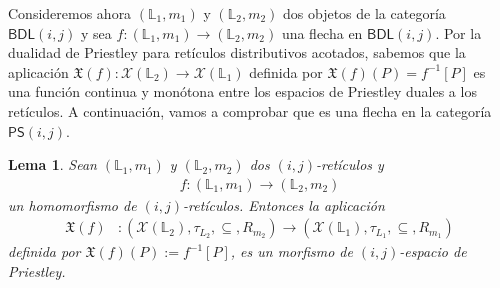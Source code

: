 \documentclass[12pt]{book}
\newtheorem{lemma}[theorem]{Lema}
\newcommand{\BDL}{\mathsf{BDL}}
\newcommand{\PS}{\mathsf{PS}}
\begin{document}
Consideremos ahora $(\mathbb{L}_1, m_1)$ y $(\mathbb{L}_2, m_2)$ dos objetos de la categoría $\BDL(i,j)$ y sea 
$f: (\mathbb{L}_1, m_1) \to (\mathbb{L}_2, m_2)$ una flecha en $\BDL(i,j)$. Por la dualidad de Priestley para retículos distributivos acotados, sabemos que la aplicación $\mathfrak{X}(f) \colon \mathcal{X}(\mathbb{L}_2) \to \mathcal{X}(\mathbb{L}_1)$ definida por $\mathfrak{X}(f)(P) = f^{-1}[P]$ es una función continua y monótona entre los espacios de Priestley duales a los retículos. A continuación, vamos a comprobar que es una flecha en la categoría $\PS(i,j)$.


\begin{lemma} \label{Lema de Functorialidad de BDL(i,j)} 
Sean $(\mathbb{L}_1, m_1)$ y $(\mathbb{L}_2, m_2)$ dos $(i,j)$-retículos y  
\begin{align*}
f: (\mathbb{L}_1, m_1) \to (\mathbb{L}_2, m_2)
\end{align*}
un homomorfismo de $(i,j)$-retículos. Entonces la aplicación 
\begin{align*}
\mathfrak{X}(f)&: (\mathcal{X}(\mathbb{L}_2), \tau_{L_2}, \subseteq, R_{m_2}) \to (\mathcal{X}(\mathbb{L}_1), \tau_{L_1}, \subseteq, R_{m_1})
\end{align*}
definida por $\mathfrak{X}(f)(P) := f^{-1}[P]$, es un morfismo de $(i,j)$-espacio de Priestley.
\end{lemma}
\end{document}
